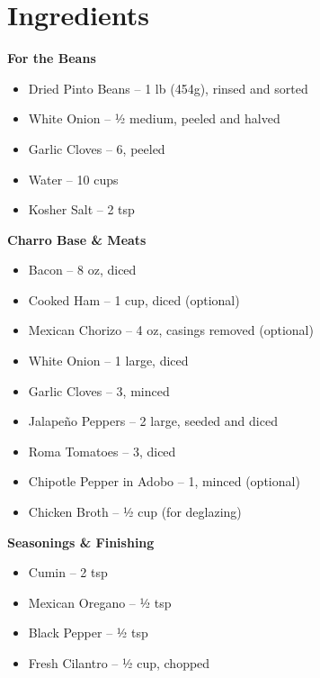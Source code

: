 




\section*{Ingredients}

\textbf{For the Beans}
\begin{itemize}[itemsep=0.1em, label={\raisebox{-0.1ex}{\large\textbullet}}]
      \item Dried Pinto Beans – 1 lb (454g), rinsed and sorted
      \item[\cut] White Onion – ½ medium, peeled and halved
      \item[\cut] Garlic Cloves – 6, peeled
      \item[\measure] Water – 10 cups
      \item[\measure] Kosher Salt – 2 tsp
\end{itemize}

\textbf{Charro Base \& Meats}
\begin{itemize}[itemsep=0.1em, label={\raisebox{-0.1ex}{\large\textbullet}}]
      \item[\cut] Bacon – 8 oz, diced
      \item[\cut] Cooked Ham – 1 cup, diced (optional)
      \item Mexican Chorizo – 4 oz, casings removed (optional)
      \item[\cut] White Onion – 1 large, diced
      \item[\cut] Garlic Cloves – 3, minced
      \item[\cut] Jalapeño Peppers – 2 large, seeded and diced
      \item[\cut] Roma Tomatoes – 3, diced
      \item[\cut] Chipotle Pepper in Adobo – 1, minced (optional)
      \item[\measure] Chicken Broth – ½ cup (for deglazing)
\end{itemize}

\textbf{Seasonings \& Finishing}
\begin{itemize}[itemsep=0.1em, label={\raisebox{-0.1ex}{\large\textbullet}}]
      \item[\measure] Cumin – 2 tsp
      \item[\measure] Mexican Oregano – ½ tsp
      \item[\measure] Black Pepper – ½ tsp
      \item[\cut] Fresh Cilantro – ½ cup, chopped
\end{itemize}

